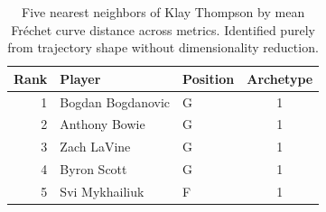 \begin{table}[htbp]
  \centering\small
  \begin{tabular}{rllc}
    \toprule
    Rank & Player & Position & Archetype \\
    \midrule
    1 & Bogdan Bogdanovic & G & 1 \\
    2 & Anthony Bowie & G & 1 \\
    3 & Zach LaVine & G & 1 \\
    4 & Byron Scott & G & 1 \\
    5 & Svi Mykhailiuk & F & 1 \\
    \bottomrule
  \end{tabular}
  \caption{Five nearest neighbors of Klay Thompson by mean Fr\'{e}chet curve distance across metrics. Identified purely from trajectory shape without dimensionality reduction.}
  \label{tab:Klay_Thompson_frechet_curve_neighbors}
\end{table}

